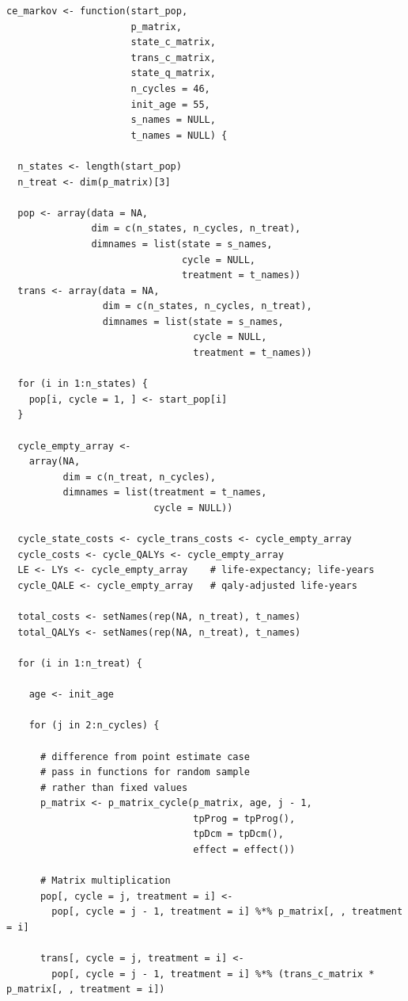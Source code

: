 \documentclass[a4paper,twoside,openany]{../svmonoBUGS}\usepackage[]{graphicx}\usepackage[]{color}
\begin{document}
\begin{verbatim}
ce_markov <- function(start_pop,
                      p_matrix,
                      state_c_matrix,
                      trans_c_matrix,
                      state_q_matrix,
                      n_cycles = 46,
                      init_age = 55,
                      s_names = NULL,
                      t_names = NULL) {
  
  n_states <- length(start_pop)
  n_treat <- dim(p_matrix)[3]
  
  pop <- array(data = NA,
               dim = c(n_states, n_cycles, n_treat),
               dimnames = list(state = s_names,
                               cycle = NULL,
                               treatment = t_names))
  trans <- array(data = NA,
                 dim = c(n_states, n_cycles, n_treat),
                 dimnames = list(state = s_names,
                                 cycle = NULL,
                                 treatment = t_names))
  
  for (i in 1:n_states) {
    pop[i, cycle = 1, ] <- start_pop[i]
  }

  cycle_empty_array <-
    array(NA,
          dim = c(n_treat, n_cycles),
          dimnames = list(treatment = t_names,
                          cycle = NULL))
  
  cycle_state_costs <- cycle_trans_costs <- cycle_empty_array
  cycle_costs <- cycle_QALYs <- cycle_empty_array
  LE <- LYs <- cycle_empty_array    # life-expectancy; life-years
  cycle_QALE <- cycle_empty_array   # qaly-adjusted life-years
  
  total_costs <- setNames(rep(NA, n_treat), t_names)
  total_QALYs <- setNames(rep(NA, n_treat), t_names)
  
  for (i in 1:n_treat) {
    
    age <- init_age
    
    for (j in 2:n_cycles) {
      
      # difference from point estimate case
      # pass in functions for random sample
      # rather than fixed values
      p_matrix <- p_matrix_cycle(p_matrix, age, j - 1,
                                 tpProg = tpProg(),
                                 tpDcm = tpDcm(),
                                 effect = effect())
      
      # Matrix multiplication
      pop[, cycle = j, treatment = i] <-
        pop[, cycle = j - 1, treatment = i] %*% p_matrix[, , treatment = i]
      
      trans[, cycle = j, treatment = i] <-
        pop[, cycle = j - 1, treatment = i] %*% (trans_c_matrix * p_matrix[, , treatment = i])
      

\end{verbatim}
\end{document}

